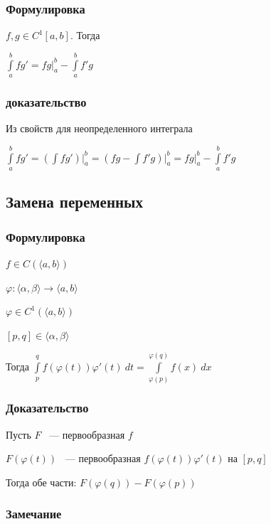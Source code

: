 \documentclass{article}
\begin{document}
			\subsubsection{Формулировка}
			
                $f, g \in C^{1}[a, b]$. Тогда
			
                $\int\limits^b_a f g' = fg \bigg|^b_a - \int\limits^b_a f'g$
			
			\subsubsection{доказательство}
			
                Из свойств для неопределенного интеграла
			
                $\int\limits^b_a f g' = \left(\int f g'\right) \bigg|^b_a = \left(fg - \int f' g\right) \bigg|^b_a = fg \bigg|^b_a - \int\limits^b_a f'g$
		
		\subsection{Замена переменных}

			\subsubsection{Формулировка}
			
                $f \in C(\langle a, b \rangle)$

                $\varphi : \langle \alpha, \beta \rangle \rightarrow \langle a, b \rangle$

                $\varphi \in C^1 (\langle a, b \rangle)$

                $[p, q] \in \langle \alpha, \beta \rangle$

                Тогда $\int\limits^q_p f(\varphi(t))\varphi'(t) \ dt = \int\limits^{\varphi(q)}_{\varphi(p)} f(x) \ dx$

			\subsubsection{Доказательство}

                Пусть $F$ ~--- первообразная $f$
	
                $F(\varphi(t))$ ~--- первообразная $f(\varphi(t))\varphi'(t)$ на $[p, q]$

                Тогда обе части: $F(\varphi(q)) - F(\varphi(p))$

			\subsubsection{Замечание}
\end{document}
